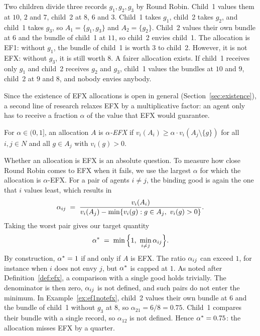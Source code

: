 \begin{example}\label{ex:ef1notefx}
Two children divide three records $g_1,g_2,g_3$ by Round Robin. Child~1 values them at $10$, $2$
and $7$, child~2 at $8$, $6$ and $3$. Child~1 takes $g_1$, child~2 takes $g_2$, and child~1 takes
$g_3$, so $A_1=\{g_1,g_3\}$ and $A_2=\{g_2\}$. Child~2 values their own bundle at $6$ and the bundle
of child~1 at $11$, so child~2 envies child~1. The allocation is EF1: without $g_1$, the bundle of child~1 is worth $3$ to child~2. However, it is not EFX:
without $g_3$, it is still worth $8$. A fairer allocation
exists. If child~1 receives only $g_1$ and child~2 receives $g_2$ and $g_3$, child~1 values the
bundles at $10$ and $9$, child~2 at $9$ and $8$, and nobody envies anybody.
\end{example}

Since the existence of EFX allocations is open in general (Section~\ref{sec:existence}), a second line of research relaxes EFX by
a multiplicative factor: an agent only has to receive a fraction $\alpha$ of the value that EFX would
guarantee.

\begin{definition}
For $\alpha\in(0,1]$, an allocation $A$ is \textit{$\alpha$-EFX} if
$v_i(A_i)\geq\alpha\cdot v_i(A_j\setminus\{g\})$ for all $i,j\in N$ and all $g\in A_j$ with
$v_i(g)>0$.
\end{definition}


Whether an allocation is EFX is an absolute question. To measure how close Round Robin comes to
EFX when it fails, we use the largest $\alpha$ for which the allocation is $\alpha$-EFX. For a pair
of agents $i\neq j$, the binding good is again the one that $i$ values least, which results in
\[
  \aij \;=\; \frac{v_i(A_i)}{v_i(A_j)-\min\{v_i(g) : g\in A_j,\ v_i(g)>0\}}.
\]
Taking the worst pair gives our target quantity
\[
  \alpha^{*} \;=\; \min\Big\{1,\ \min_{i\neq j}\alpha_{ij}\Big\}.
\]
By construction, $\alpha^{*}=1$ if and only if $A$ is EFX. The ratio $\alpha_{ij}$ can exceed $1$, for instance
when $i$ does not envy $j$, but $\alpha^{*}$ is capped at $1$. As noted after
Definition~\ref{def:efx}, a comparison with a single good holds trivially. The denominator is
then zero, $\alpha_{ij}$ is not defined, and such pairs do not enter the minimum. In Example~\ref{ex:ef1notefx}, child~2 values their own bundle at $6$ and
the bundle of child~1 without $g_3$ at $8$, so $\alpha_{21}=6/8=0.75$. Child~1 compares their
bundle with a single record, so $\alpha_{12}$ is not defined. Hence $\alpha^{*}=0.75$: the allocation
misses EFX by a quarter.


